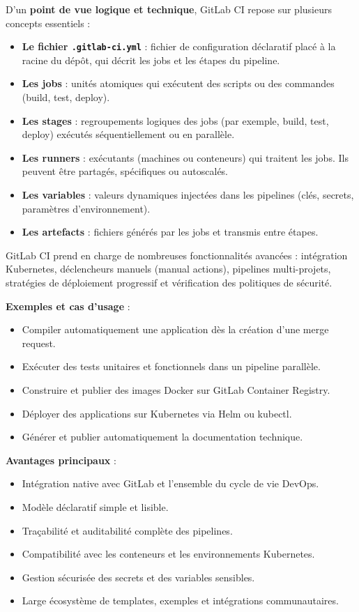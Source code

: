 D’un \textbf{point de vue logique et technique}, GitLab CI repose sur plusieurs concepts essentiels  :
\begin{itemize}
	\item \textbf{Le fichier \texttt{.gitlab-ci.yml}}  : fichier de configuration déclaratif placé à la racine du dépôt, qui décrit les jobs et les étapes du pipeline.
	\item \textbf{Les jobs}  : unités atomiques qui exécutent des scripts ou des commandes (build, test, deploy).
	\item \textbf{Les stages}  : regroupements logiques des jobs (par exemple, build, test, deploy) exécutés séquentiellement ou en parallèle.
	\item \textbf{Les runners}  : exécutants (machines ou conteneurs) qui traitent les jobs. Ils peuvent être partagés, spécifiques ou autoscalés.
	\item \textbf{Les variables}  : valeurs dynamiques injectées dans les pipelines (clés, secrets, paramètres d’environnement).
	\item \textbf{Les artefacts}  : fichiers générés par les jobs et transmis entre étapes.
\end{itemize}

GitLab CI prend en charge de nombreuses fonctionnalités avancées  : intégration Kubernetes, déclencheurs manuels (manual actions), pipelines multi-projets, stratégies de déploiement progressif et vérification des politiques de sécurité.

\textbf{Exemples et cas d’usage} :
\begin{itemize}
	\item Compiler automatiquement une application dès la création d’une merge request.
	\item Exécuter des tests unitaires et fonctionnels dans un pipeline parallèle.
	\item Construire et publier des images Docker sur GitLab Container Registry.
	\item Déployer des applications sur Kubernetes via Helm ou kubectl.
	\item Générer et publier automatiquement la documentation technique.
\end{itemize}

\textbf{Avantages principaux} :
\begin{itemize}
	\item Intégration native avec GitLab et l’ensemble du cycle de vie DevOps.
	\item Modèle déclaratif simple et lisible.
	\item Traçabilité et auditabilité complète des pipelines.
	\item Compatibilité avec les conteneurs et les environnements Kubernetes.
	\item Gestion sécurisée des secrets et des variables sensibles.
	\item Large écosystème de templates, exemples et intégrations communautaires.
\end{itemize}

